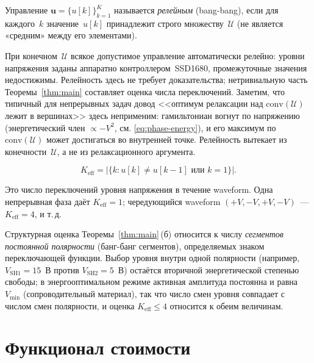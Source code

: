 \begin{definition}\label{def:bang-bang}
Управление $\mathbf{u} = \{u[k]\}_{k=1}^{K}$ называется
\emph{релейным} (bang-bang), если для каждого~$k$ значение~$u[k]$ принадлежит
строго множеству~$\mathcal{U}$ (не является «средним» между его элементами).
\end{definition}

При конечном~$\mathcal{U}$ всякое допустимое управление автоматически
релейно: уровни напряжения заданы аппаратно контроллером~SSD1680,
промежуточные значения недостижимы. Релейность здесь не требует доказательства;
нетривиальную часть Теоремы~\ref{thm:main} составляет оценка числа переключений.
Заметим, что типичный для непрерывных задач довод
<<оптимум релаксации над $\mathrm{conv}(\mathcal{U})$ лежит в вершинах>> здесь
неприменим: гамильтониан вогнут по напряжению (энергетический член
$\propto -V^2$, см. \eqref{eq:phase-energy}), и его максимум
по~$\mathrm{conv}(\mathcal{U})$ может достигаться во внутренней точке.
Релейность вытекает из конечности~$\mathcal{U}$, а не из релаксационного
аргумента.

\begin{definition}\label{def:K-eff}
$$K_{\mathrm{eff}} = \bigl|\{ k : u[k] \ne u[k-1] \text{ или } k = 1\}\bigr|.$$
\end{definition}

Это число переключений уровня напряжения в течение waveform. Одна
непрерывная фаза даёт $K_{\mathrm{eff}} = 1$;
чередующийся waveform $(+V, -V, +V, -V)$~--- $K_{\mathrm{eff}} = 4$, и т.\,д.

\begin{remark}\label{rem:keff-polarity}
Структурная оценка Теоремы~\ref{thm:main}\,(б) относится к числу
\emph{сегментов постоянной полярности} (банг-банг сегментов), определяемых
знаком переключающей функции. Выбор уровня внутри одной полярности
(например, $V_{\mathrm{SH1}} = 15$~В против $V_{\mathrm{SH2}} = 5$~В) остаётся
вторичной энергетической степенью свободы; в энергооптимальном режиме активная
амплитуда постоянна и равна $V_{\min}$ (сопроводительный материал), так что
число смен уровня совпадает с числом смен полярности, и оценка
$K_{\mathrm{eff}} \le 4$ относится к обеим величинам.
\end{remark}


\section{Функционал стоимости}\label{sec:cost-functional}


